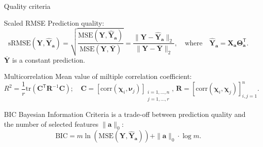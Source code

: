 \documentclass[9pt]{beamer}
\newcommand{\ba}{\mathbf{a}}
\newcommand{\bY}{\mathbf{Y}}
\newcommand{\bX}{\mathbf{X}}
\newcommand{\bC}{\mathbf{C}}
\newcommand{\bchi}{\boldsymbol{\chi}}
\newcommand{\bnu}{\boldsymbol{\nu}}
\newcommand{\bTheta}{\boldsymbol{\Theta}}
\newcommand{\T}{\mathsf{T}}
\begin{document}
\begin{frame}{Quality criteria}

\begin{block}{Scaled RMSE}
	Prediction quality:
	\[
	\text{sRMSE}(\bY, \widehat{\bY}_{\ba}) = \sqrt{\frac{\text{MSE} (\bY, \widehat{\bY}_{\ba})}{\text{MSE} (\bY, \overline{\bY})}} =  \frac{\| \bY - \widehat{\bY}_{\ba} \|_2}{\| \bY - \overline{\bY} \|_2}, \quad \text{where} \quad \widehat{\bY}_{\ba} = \bX_{\ba} \bTheta_{\ba}^{\T}.
	\]
	$\overline{\bY}$ is a constant prediction.
\end{block}

\begin{block}{Multicorrelation}
	Mean value of miltiple correlation coefficient:
	\[
	R^2 = \frac{1}{r} \text{tr} \left( \bC^{\T} \mathbf{R}^{-1} \bC \right); \quad \bC = [ \text{corr}(\bchi_i, \bnu_j)]_{\substack{i=1, \dots, n \\ j=1, \dots, r}}, \, \mathbf{R} = [ \text{corr}(\bchi_i, \bchi_j)]_{i, j = 1}^n.
	\]
\end{block}
\begin{block}{BIC}
	Bayesian Information Criteria is a trade-off between prediction quality and the number of selected features $\|\ba\|_0$:
	\[
	\text{BIC} = m \ln \left( \text{MSE} ( \bY, \widehat{\bY}_{\ba})\right) + \| \ba \|_0 \cdot \log m.
	\]
\end{block}
\end{frame}
\end{document}
